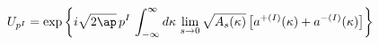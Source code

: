 \begin{equation}
U_{p^I}=\exp\left\{
i\sqrt{2\ap}\,p^I\,\int_{-\infty}^{\infty}
d\kappa\,\lim_{s\to 0}\sqrt{A_s(\kappa)}\,\bigl[
a^{+(I)}(\kappa)+a^{-(I)}(\kappa)
\bigr]
\right\}
\end{equation}

